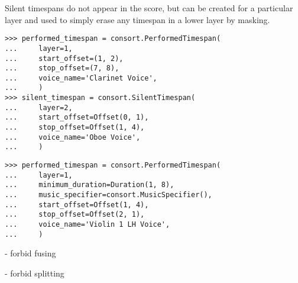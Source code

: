 Silent timespans do not appear in the score, but can be created for a
particular layer and used to simply erase any timespan in a lower layer by
masking.

\begin{comment}
<abjad>
performed_timespan = consort.PerformedTimespan(
    layer=1,
    start_offset=(1, 2),
    stop_offset=(7, 8),
    voice_name='Clarinet Voice',
    )
silent_timespan = consort.SilentTimespan(
    layer=2,
    start_offset=Offset(0, 1),
    stop_offset=Offset(1, 4),
    voice_name='Oboe Voice',
    )
</abjad>
\end{comment}

\begin{singlespacing}
\vspace{-0.5\baselineskip}
\begin{lstlisting}
>>> performed_timespan = consort.PerformedTimespan(
...     layer=1,
...     start_offset=(1, 2),
...     stop_offset=(7, 8),
...     voice_name='Clarinet Voice',
...     )
>>> silent_timespan = consort.SilentTimespan(
...     layer=2,
...     start_offset=Offset(0, 1),
...     stop_offset=Offset(1, 4),
...     voice_name='Oboe Voice',
...     )
\end{lstlisting}
\end{singlespacing}

\begin{comment}
<abjad>
performed_timespan = consort.PerformedTimespan(
    layer=1,
    minimum_duration=Duration(1, 8),
    music_specifier=consort.MusicSpecifier(),
    start_offset=Offset(1, 4),
    stop_offset=Offset(2, 1),
    voice_name='Violin 1 LH Voice',
    )
</abjad>
\end{comment}

\begin{singlespacing}
\vspace{-0.5\baselineskip}
\begin{lstlisting}
>>> performed_timespan = consort.PerformedTimespan(
...     layer=1,
...     minimum_duration=Duration(1, 8),
...     music_specifier=consort.MusicSpecifier(),
...     start_offset=Offset(1, 4),
...     stop_offset=Offset(2, 1),
...     voice_name='Violin 1 LH Voice',
...     )
\end{lstlisting}
\end{singlespacing}

- forbid fusing

- forbid splitting

